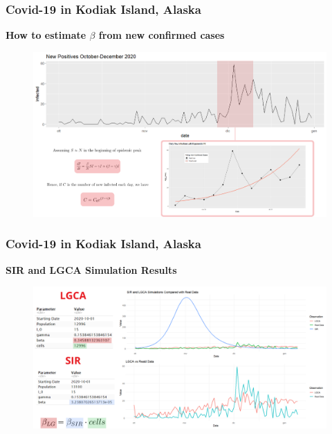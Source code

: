 \documentclass[usenames,dvipsnames]{beamer}
\newcommand{\dftitle}[2]{\color{#2}\bf{#1}\color{black}}
\begin{document}
\begin{frame}
	\frametitle{Covid-19 in Kodiak Island, Alaska}
\begin{center}
	\dftitle{How to estimate $\beta$ from new confirmed cases}{Bittersweet}
	\end{center}

	\begin{figure}
		\centering
		\includegraphics[width=0.95\linewidth]{beta_est}
	\end{figure}
\end{frame}

\begin{frame}
	\frametitle{Covid-19 in Kodiak Island, Alaska}
	\begin{center}
		\dftitle{SIR and LGCA Simulation Results}{Bittersweet}
	\end{center}
	\begin{figure}
		\centering
		\includegraphics[width=0.95\linewidth]{Simul1_pres}
	\end{figure}
	
\end{frame}
\end{document}
